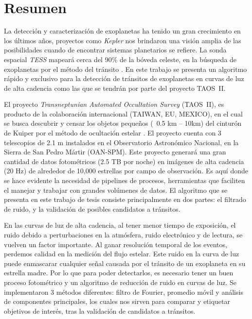 \thispagestyle{plain}
\newpage

\chapter*{\textbf{Resumen}}

La detección y caracterización de exoplanetas ha tenido un gran crecimiento en los últimos años, proyectos como \textit{Kepler} nos brindaron una visión amplia de las posibilidades cuando de encontrar sistemas planetarios se refiere. La sonda espacial \textit{TESS} mapeará cerca del 90\% de la bóveda celeste, en la búsqueda de exoplanetas por el método del tránsito \cite{ricker2014transiting}. En este trabajo se presenta un algoritmo rápido y exclusivo para la detección de tránsitos de exoplanetas en curvas de luz de alta cadencia como las que se tendrán por parte del proyecto TAOS~II.  

El proyecto \textit{Transneptunian Automated Occultation Survey} (TAOS~II), es producto de la colaboración internacional (TAIWAN, EU, MEXICO), en el cual se busca descubrir y censar los objetos pequeños (~0.5 km – 10km) del cinturón de Kuiper por el método de ocultación estelar \cite{lehner2012transneptunian}. El proyecto cuenta con 3 telescopios de 2.1 m instalados en el Observatorio Astronómico Nacional, en la Sierra de San Pedro Mártir (OAN-SPM). Este proyecto generará una gran cantidad de datos fotométricos (2.5 TB por noche) en imágenes de alta cadencia (20 Hz) de alrededor de 10,000 estrellas por campo de observación. Es aquí donde se hace evidente la necesidad de pipelines de procesos, herramientas que faciliten el manejar y trabajar con grandes volúmenes de datos. El algoritmo que se presenta en este trabajo de tesis consiste principalmente en dos partes: el filtrado de ruido, y la validación de posibles candidatos a tránsitos.

En las curvas de luz de alta cadencia, al tener menor tiempo de exposición, el ruido debido a perturbaciones en la atmósfera, ruido electrónico y de lectura, se vuelven un factor importante. Al ganar resolución temporal de los eventos, perdemos calidad en la medición del flujo estelar. Este ruido en la curva de luz puede enmascarar cualquier señal causada por el tránsito de un exoplaneta en su estrella madre. Por lo que para poder detectarlos, es necesario tener un buen proceso fotométrico y un algoritmo de reducción de ruido en curvas de luz. Se implementaron 3 métodos diferentes: filtro de Fourier, promedio móvil y análisis de componentes principales, los cuales nos sirven para comparar y etiquetar objetivos de interés, tras la validación de candidatos a tránsitos.


